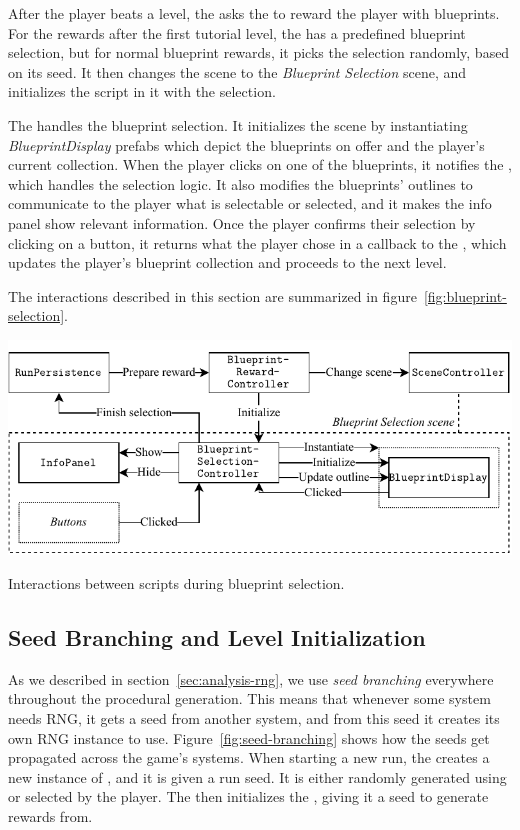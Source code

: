 After the player beats a level, the  asks the  to reward the player with blueprints.
For the rewards after the first tutorial level, the  has a predefined blueprint selection, but for normal blueprint rewards, it picks the selection randomly, based on its seed.
It then changes the scene to the \emph{Blueprint Selection} scene, and initializes the  script in it with the selection.

The  handles the blueprint selection.
It initializes the scene by instantiating \emph{BlueprintDisplay} prefabs which depict the blueprints on offer and the player's current collection.
When the player clicks on one of the blueprints, it notifies the , which handles the selection logic.
It also modifies the blueprints' outlines to communicate to the player what is selectable or selected, and it makes the info panel show relevant information.
Once the player confirms their selection by clicking on a button, it returns what the player chose in a callback to the , which updates the player's blueprint collection and proceeds to the next level.

The interactions described in this section are summarized in figure~\ref{fig:blueprint-selection}.
\begin{center}
    \captionsetup{type=figure}
    \includegraphics[width=\textwidth]{img/blueprint selection.pdf}
    \caption{Interactions between scripts during blueprint selection.}
    \label{fig:blueprint-selection}
\end{center}

\subsection{Seed Branching and Level Initialization}

As we described in section~\ref{sec:analysis-rng}, we use \emph{seed branching} everywhere throughout the procedural generation.
This means that whenever some system needs RNG, it gets a seed from another system, and from this seed it creates its own RNG instance to use.
Figure~\ref{fig:seed-branching} shows how the seeds get propagated across the game's systems.
When starting a new run, the  creates a new instance of , and it is given a run seed.
It is either randomly generated using  or selected by the player.
The  then initializes the , giving it a seed to generate rewards from.

